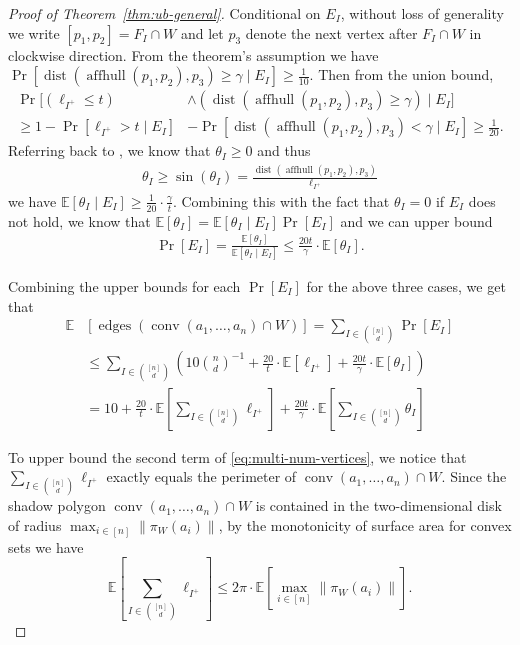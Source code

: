 \documentclass{article}\usepackage[a4paper,margin=20mm]{geometry}
\newcommand{\E}{\mathbb E}
\newcommand{\aff}{\operatorname{affhull}}
\newcommand{\conv}{\operatorname{conv}}
\newcommand{\edges}{\operatorname{edges}}
\newcommand{\dist}{\operatorname{dist}}
\begin{document}
\begin{proof}[Proof of Theorem~\ref{thm:ub-general}]
    Conditional on $E_I$, without loss of generality we write $[p_1, p_2] = F_I \cap W$ and let $p_3$ denote the next vertex after $F_I \cap W$ in clockwise direction.
    From the theorem's assumption we have
    $\Pr[\dist(\aff(p_1, p_2), p_3) \geq \gamma \mid  E_I] \geq \frac{1}{10}$.
    Then from the union bound,
    \begin{align*}
    \Pr[(\ell_{I^+} \leq t) &\wedge (\dist(\aff(p_1, p_2), p_3) \geq \gamma) \mid E_I]\\
    \geq 1 - \Pr[\ell_{I^+} > t \mid E_I] &- \Pr[\dist(\aff(p_1, p_2), p_3) < \gamma \mid E_I]
    \geq \frac{1}{20}.
    \end{align*}
    Referring back to , we know that $\theta_I \geq 0$ and thus
    \begin{align*}
        \theta_I \geq \sin(\theta_I) =  \frac{\dist(\aff(p_1, p_2), p_3)}{\ell_{I^+}}
    \end{align*}
    we have $\E[\theta_I \mid E_I] \geq \frac{1}{20} \cdot \frac{\gamma}{t}$.
    Combining this with the fact that  $\theta_{I}=0$ if $E_{I}$ does not hold, we know that
    $\E[\theta_I] = \E[\theta_I \mid E_I] \Pr[E_I]$ and we can upper bound
    \begin{align*}
        \Pr[E_I] = \frac{\E[\theta_I ]}{\E[\theta_I \mid E_I]} 
        \leq \frac{20 t}{\gamma} \cdot \E[\theta_I].
    \end{align*}

  
    Combining the upper bounds for each $\Pr[E_I]$ for the above three cases, we get that
    \begin{align}\label{eq:multi-num-vertices}
    \E&\left[ \edges\left(\conv(a_1, \ldots, a_n) \cap W \right) \right] = \sum_{I \in \binom{[n]}{d}} \Pr[E_I] \nonumber \\
    &\leq  \sum_{I \in \binom{[n]}{d}} \left( 10 \binom n d ^{-1} + \frac{20}{t} \cdot \E[\ell_{I^+}]
    + \frac{20t}{\gamma} \cdot \E[\theta_I]  \right) \nonumber \\
    &=  10 + \frac{20}{t} \cdot \E[\sum_{I \in \binom{[n]}{d}} \ell_{I^+}]
        + \frac{20 t}{\gamma}
        \cdot \E[\sum_{I \in \binom{[n]}{d}}\theta_I]
    \end{align}
    
    To upper bound the second term of \eqref{eq:multi-num-vertices},
    we notice that $\sum_{I \in \binom{[n]}{d}} \ell_{I^+}$ exactly equals
        the perimeter of $\conv(a_1,\dots,a_n) \cap W$. 
    Since the shadow polygon
        $\conv(a_1, \ldots, a_n)\cap W$ is contained in the two-dimensional disk of radius $\max_{i\in [n]} \|\pi_{W}(a_i)\|$,
    by the monotonicity of surface area for convex sets we have
    \[
        \E[\sum_{I \in \binom{[n]}{d}} \ell_{I^+}]
        \leq 2\pi \cdot \E[\max_{i\in [n]} \|\pi_W(a_i)\|].
    \]
        

\end{proof}
\end{document}
